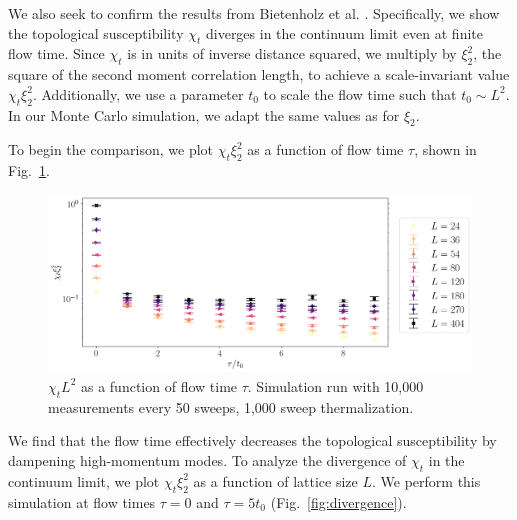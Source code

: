 We also seek to confirm the results from Bietenholz et al. \cite{bietenholz2018}. Specifically, we show the topological susceptibility $\chi_t$ diverges in the continuum limit even at finite flow time. Since $\chi_t$ is in units of inverse distance squared, we multiply by $\xi_2^2$, the square of the second moment correlation length, to achieve a scale-invariant value $\chi_t\xi_2^2$. Additionally, we use a parameter $t_0$ to scale the flow time such that $t_0\sim L^2$. In our Monte Carlo simulation, we adapt the same values as \cite{bietenholz2018} for $\xi_2$.

To begin the comparison, we plot $\chi_t\xi_2^2$ as a function of flow time $\tau$, shown in Fig.~\ref{fig:bietenholz}.
\begin{figure}[h!]
    \centering
      \includegraphics[width=\textwidth]{imgs/bietenholz.png}
      \caption{\label{fig:bietenholz} $\chi_t L^2$ as a  function of flow time $\tau$. Simulation run with 10,000 measurements every 50 sweeps, 1,000 sweep thermalization.}
\end{figure}
We find that the flow time effectively decreases the topological susceptibility by dampening high-momentum modes. To analyze the divergence of $\chi_t$ in the continuum limit, we plot $\chi_t \xi_2^2$ as a function of lattice size $L$. We perform this simulation at flow times $\tau=0$ and $\tau=5t_0$ (Fig.~\ref{fig:divergence}).
